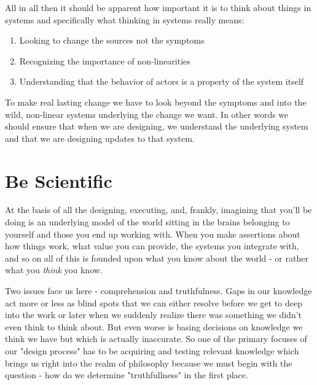 \documentclass[11pt,a5paper]{book}
\begin{document}
All in all then it should be apparent how important it is to think about things in systems and specifically what thinking in systems really means:

\begin{enumerate}
\item Looking to change the sources not the symptoms
\item Recognizing the importance of non-linearities
\item Understanding that the behavior of actors is a property of the system itself
\end{enumerate}

To make real lasting change we have to look beyond the symptoms and into the wild, non-linear systems underlying the change we want. In other words we should ensure that when we are designing, we understand the underlying system and that we are designing updates to that system.  

\section{Be Scientific}
At the basis of all the designing, executing, and, frankly, imagining that you'll be doing is an underlying model of the world sitting in the brains belonging to yourself and those you end up working with. When you make assertions about how things work, what value you can provide, the systems you integrate with, and so on all of this is founded upon what you know about the world - or rather what you \textit{think} you know. 
\newline

Two issues face us here - comprehension and truthfulness. Gaps in our knowledge act more or less as blind spots that we can either resolve before we get to deep into the work or later when we suddenly realize there was something we didn't even think to think about. But even worse is basing decisions on knowledge we think we have but which is actually inaccurate. So one of the primary focuses of our "design process" has to be acquiring and testing relevant knowledge which brings us right into the realm of philosophy because we must begin with the question - how do we determine "truthfullness" in the first place.
\end{document}
